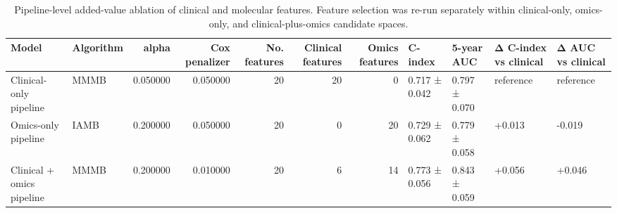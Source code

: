 \begin{table}
\caption{Pipeline-level added-value ablation of clinical and molecular features. Feature selection was re-run separately within clinical-only, omics-only, and clinical-plus-omics candidate spaces.}
\label{tab:reviewer3_pipeline_ablation}
\begin{tabular}{llrrrrrllll}
\toprule
Model & Algorithm & alpha & Cox penalizer & No. features & Clinical features & Omics features & C-index & 5-year AUC & Δ C-index vs clinical & Δ AUC vs clinical \\
\midrule
Clinical-only pipeline & MMMB & 0.050000 & 0.050000 & 20 & 20 & 0 & 0.717 ± 0.042 & 0.797 ± 0.070 & reference & reference \\
Omics-only pipeline & IAMB & 0.200000 & 0.050000 & 20 & 0 & 20 & 0.729 ± 0.062 & 0.779 ± 0.058 & +0.013 & -0.019 \\
Clinical + omics pipeline & MMMB & 0.200000 & 0.010000 & 20 & 6 & 14 & 0.773 ± 0.056 & 0.843 ± 0.059 & +0.056 & +0.046 \\
\bottomrule
\end{tabular}
\end{table}
